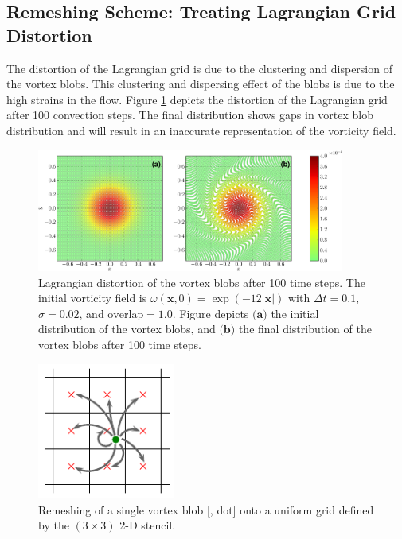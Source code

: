 \subsection{Remeshing Scheme: Treating Lagrangian Grid Distortion}
\label{subsec:remeshing}

The distortion of the Lagrangian grid is due to the clustering and dispersion of the vortex blobs. This clustering and dispersing effect of the blobs is due to the high strains in the flow. Figure \ref{fig:distortion} depicts the distortion of the Lagrangian grid after 100 convection steps. The final distribution shows gaps in vortex blob distribution and will result in an inaccurate representation of the vorticity field. 

	\begin{figure}[!h]
	\centering
	\includegraphics[width=0.9\textwidth]{figures/lagrangian/distortion-crop.pdf}
    \caption{Lagrangian distortion of the vortex blobs after 100 time steps. The initial vorticity field is $\omega\left(\mathbf{x},0\right) = \exp\left(-12\left|\mathbf{x}\right|\right)$ with $\Delta t = 0.1$, $\sigma=0.02$, and $\mathrm{overlap} = 1.0$. Figure depicts $\textbf{(a)}$ the initial distribution of the vortex blobs, and $\textbf{(b)}$ the final distribution of the vortex blobs after 100 time steps.}
    \label{fig:distortion}
	\end{figure}

	\begin{figure}[!b]
	\centering
	\includegraphics[width=0.4\textwidth]{figures/lagrangian/interpolationGrid.pdf}
	\caption{Remeshing of a single vortex blob [{\color{plotGreen}{$\bullet$}}, {} dot] onto a uniform grid defined by the $\left(3\times3\right)$ 2-D stencil.}
	\label{fig:interpolationGrid}
	\end{figure}

